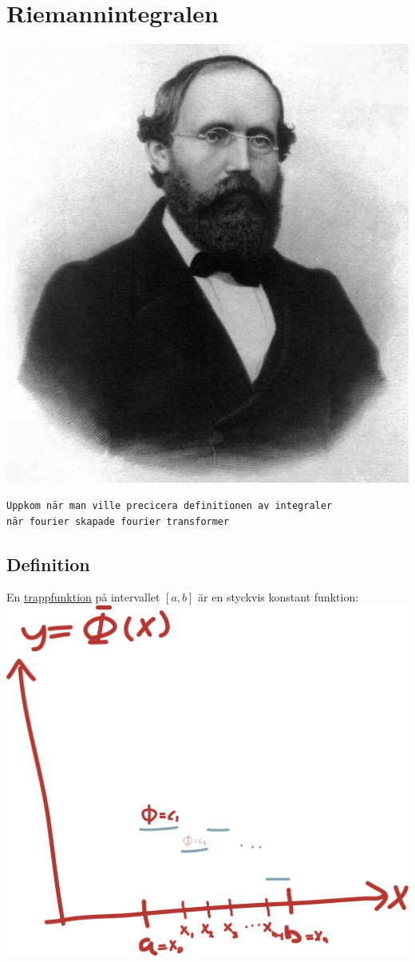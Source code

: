 \documentclass{article}
\begin{document}
\section{Riemannintegralen}
\includegraphics[scale=0.3]{img/riemann.jpeg}
\begin{verbatim}
Uppkom när man ville precicera definitionen av integraler
när fourier skapade fourier transformer
\end{verbatim}

\subsection{Definition}
En \uline{trappfunktion} på intervallet $[a, b]$ är en styckvis konstant funktion:\\
\includegraphics[scale=0.25]{img/img1.pdf}
\end{document}
